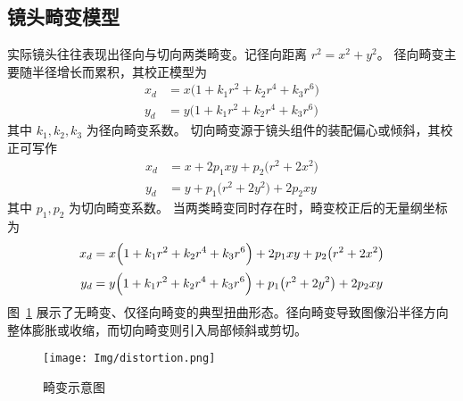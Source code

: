 \subsection{镜头畸变模型}
实际镜头往往表现出径向与切向两类畸变。记径向距离
\(
r^2 = x^2 + y^2
\)。
径向畸变主要随半径增长而累积，其校正模型为
\begin{equation}
	\begin{aligned}
		x_{d} &= x\bigl(1+k_1r^2+k_2r^4+k_3r^6\bigr)\\[2pt]
		y_{d} &= y\bigl(1+k_1r^2+k_2r^4+k_3r^6\bigr)
	\end{aligned}
\end{equation}
其中 $k_1,k_2,k_3$ 为径向畸变系数。
切向畸变源于镜头组件的装配偏心或倾斜，其校正可写作
\begin{equation}
	\begin{aligned}
		x_{d} &= x + 2p_1xy + p_2\bigl(r^2 + 2x^2\bigr)\\[2pt]
		y_{d} &= y + p_1\bigl(r^2 + 2y^2\bigr) + 2p_2xy
	\end{aligned}
\end{equation}
其中 $p_1,p_2$ 为切向畸变系数。
当两类畸变同时存在时，畸变校正后的无量纲坐标为
\begin{equation}
	\begin{aligned}
		x_{d} &= x\Bigl(1+k_1r^2+k_2r^4+k_3r^6\Bigr)
		+ 2p_1xy + p_2\bigl(r^2 + 2x^2\bigr)\\[2pt]
		y_{d} &= y\Bigl(1+k_1r^2+k_2r^4+k_3r^6\Bigr)
		+ p_1\bigl(r^2 + 2y^2\bigr) + 2p_2xy
	\end{aligned}
	\label{eq:comprehensive_distortion}
\end{equation}
图~\ref{fig:distortion_patterns} 展示了无畸变、仅径向畸变的典型扭曲形态。径向畸变导致图像沿半径方向整体膨胀或收缩，而切向畸变则引入局部倾斜或剪切。

\begin{figure}[htbp]
	\centering
	\texttt{[image: Img/distortion.png]}
	\caption{畸变示意图}
	\label{fig:distortion_patterns}
\end{figure}
